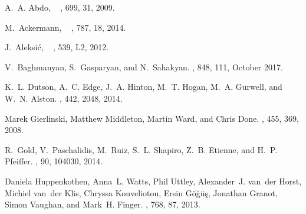 \documentclass{iau}
\begin{document}
%
%

\begin{thebibliography}{}

{A.~A. Abdo, \etal\ }
\newblock {\em \apj}, 699, 31, 2009.

M.~{Ackermann}, \etal\
\newblock {\em \apj}, 787, 18, 2014.

J.~{Aleksi{\'c}}, \etal\
\newblock {\em \aap}, 539, L2, 2012.

V.~{Baghmanyan}, S.~{Gasparyan}, and N.~{Sahakyan}.
\newblock {\em \apj}, 848, 111, October 2017.

K.~L. {Dutson}, A.~C. {Edge}, J.~A. {Hinton}, M.~T. {Hogan}, M.~A. {Gurwell},
  and W.~N. {Alston}.
\newblock {\em \mnras}, 442, 2048, 2014.

Marek Gierlinski, Matthew Middleton, Martin Ward, and Chris Done.
\newblock {\em Nature}, 455, 369, 2008.

R.~{Gold}, V.~{Paschalidis}, M.~{Ruiz}, S.~L. {Shapiro}, Z.~B. {Etienne}, and
  H.~P. {Pfeiffer}.
\newblock {\em \prd}, 90, 104030, 2014.

Daniela Huppenkothen, Anna~L. Watts, Phil Uttley, Alexander~J. van~der Horst,
  Michiel van~der Klis, Chryssa Kouveliotou, Ersin Göğüş, Jonathan Granot,
  Simon Vaughan, and Mark~H. Finger.
\newblock {\em \apj}, 768, 87, 2013.


\end{thebibliography}
\end{document}
